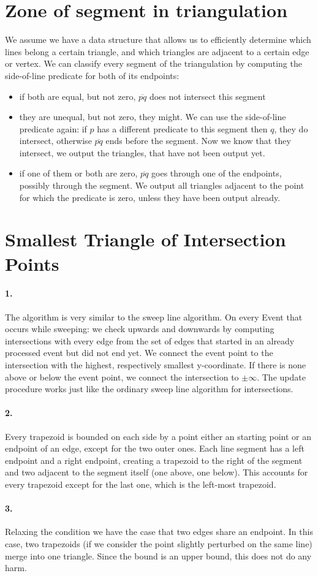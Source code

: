 \documentclass[a4paper]{scrartcl}
\begin{document}
\section*{Zone of segment in triangulation}
We assume we have a data structure that allows us to efficiently determine which lines belong a certain triangle, and which triangles are adjacent to a certain edge or vertex. We can classify every segment of the triangulation by computing the side-of-line predicate for both of its endpoints:
\begin{itemize}
  \item if both are equal, but not zero, $\overline{pq}$ does not intersect this segment
  \item they are unequal, but not zero, they might. We can use the side-of-line predicate again: if $p$ has a different predicate to this segment then $q$, they do intersect, otherwise $\overline{pq}$ ends before the segment. Now we know that they intersect, we output the triangles, that have not been output yet. 
  \item if one of them or both are zero, $\overline{pq}$ goes through one of the endpoints, possibly through the segment. We output all triangles adjacent to the point for which the predicate is zero, unless they have been output already.
\end{itemize}

\section*{Smallest Triangle of Intersection Points}
\paragraph{1.} The algorithm is very similar to the sweep line algorithm. On every Event that occurs while sweeping: we check upwards and downwards by computing intersections with every edge from the set of edges that started in an already processed event but did not end yet. We connect the event point to the intersection with the highest, respectively smallest y-coordinate. If there is none above or below the event point, we connect the intersection to $\pm \infty$. The update procedure works just like the ordinary sweep line algorithm for intersections.
\paragraph{2.} Every trapezoid is bounded on each side by a point either an starting point or an endpoint of an edge, except for the two outer ones. Each line segment has a left endpoint and a right endpoint, creating a trapezoid to the right of the segment and two adjacent to the segment itself (one above, one below). This accounts for every trapezoid except for the last one, which is the left-most trapezoid.
\paragraph{3.} Relaxing the condition we have the case that two edges share an endpoint. In this case, two trapezoids (if we consider the point slightly perturbed on the same line) merge into one triangle. Since the bound is an upper bound, this does not do any harm. 
\end{document}
